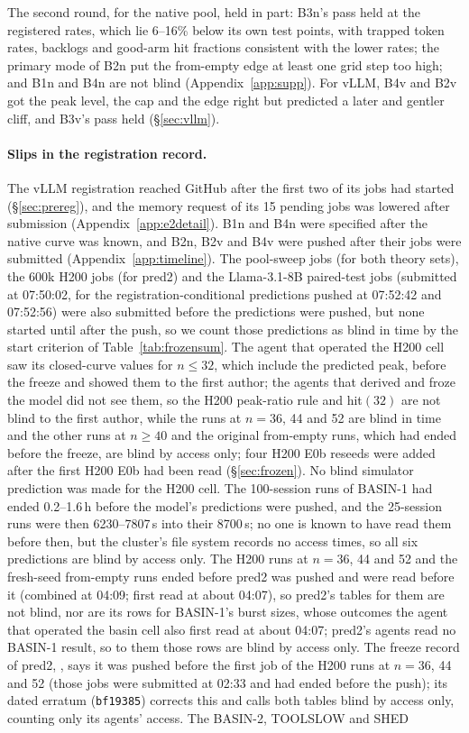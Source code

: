 The second round, for the native pool, held in part: B3n's pass held at the registered rates, which lie 6--16\% below its own test points, with trapped token rates, backlogs and good-arm hit fractions consistent with the lower rates; the primary mode of B2n put the from-empty edge at least one grid step too high; and B1n and B4n are not blind (Appendix~\ref{app:supp}). For vLLM, B4v and B2v got the peak level, the cap and the edge right but predicted a later and gentler cliff, and B3v's pass held (\S\ref{sec:vllm}).

\paragraph{Slips in the registration record.} The vLLM registration reached GitHub after the first two of its jobs had started (\S\ref{sec:prereg}), and the memory request of its 15 pending jobs was lowered after submission (Appendix~\ref{app:e2detail}). B1n and B4n were specified after the native curve was known, and B2n, B2v and B4v were pushed after their jobs were submitted (Appendix~\ref{app:timeline}). The pool-sweep jobs (for both theory sets), the 600k H200 jobs (for pred2) and the Llama-3.1-8B paired-test jobs (submitted at 07:50:02, for the registration-conditional predictions pushed at 07:52:42 and 07:52:56) were also submitted before the predictions were pushed, but none started until after the push, so we count those predictions as blind in time by the start criterion of Table~\ref{tab:frozensum}. The agent that operated the H200 cell saw its closed-curve values for $n\le32$, which include the predicted peak, before the freeze and showed them to the first author; the agents that derived and froze the model did not see them, so the H200 peak-ratio rule and hit$(32)$ are not blind to the first author, while the runs at $n=36$, 44 and 52 are blind in time and the other runs at $n\ge40$ and the original from-empty runs, which had ended before the freeze, are blind by access only; four H200 E0b reseeds were added after the first H200 E0b had been read (\S\ref{sec:frozen}). No blind simulator prediction was made for the H200 cell. The 100-session runs of BASIN-1 had ended 0.2--1.6\,h before the model's predictions were pushed, and the 25-session runs were then 6230--7807\,s into their 8700\,s; no one is known to have read them before then, but the cluster's file system records no access times, so all six predictions are blind by access only. The H200 runs at $n=36$, 44 and 52 and the fresh-seed from-empty runs ended before pred2 was pushed and were read before it (combined at 04:09; first read at about 04:07), so pred2's tables for them are not blind, nor are its rows for BASIN-1's burst sizes, whose outcomes the agent that operated the basin cell also first read at about 04:07; pred2's agents read no BASIN-1 result, so to them those rows are blind by access only. The freeze record of pred2, , says it was pushed before the first job of the H200 runs at $n=36$, 44 and 52 (those jobs were submitted at 02:33 and had ended before the push); its dated erratum (\texttt{bf19385}) corrects this and calls both tables blind by access only, counting only its agents' access. The BASIN-2, TOOLSLOW and SHED 